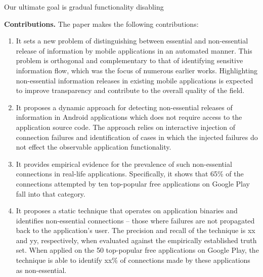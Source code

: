 Our ultimate goal is gradual functionality disabling




\vspace{0.1in}
\noindent 
{\bf Contributions.}
The paper makes the following contributions:
\begin{enumerate}
\item It sets a new problem of distinguishing between essential and non-essential release of information by mobile applications in an automated manner. This problem is orthogonal and complementary to that of identifying sensitive information flow, which was the focus of numerous earlier works. 
Highlighting non-essential information releases in existing mobile applications is expected to improve transparency and contribute to the overall quality of the field. 
\item It proposes a dynamic approach for detecting non-essential releases of information in Android applications which does not require access to the application source code. 
The approach relies on interactive injection of connection failures and identification of cases in which the injected failures do not effect the observable application functionality. 
\item It provides empirical evidence for the prevalence of such non-essential connections in real-life applications. Specifically, it shows that 65\% of the connections attempted by ten top-popular free applications on Google Play fall into that category.    
\item It proposes a static technique that operates on application binaries and identifies non-essential connections -- those where failures are not propagated back to the application's user. The precision and recall of the technique is xx and yy, respectively, when evaluated against the empirically established truth set. 
When applied on the 50 top-popular free applications on Google Play, the technique is able to identify xx\% of connections made by these applications as non-essential.
\end{enumerate}

